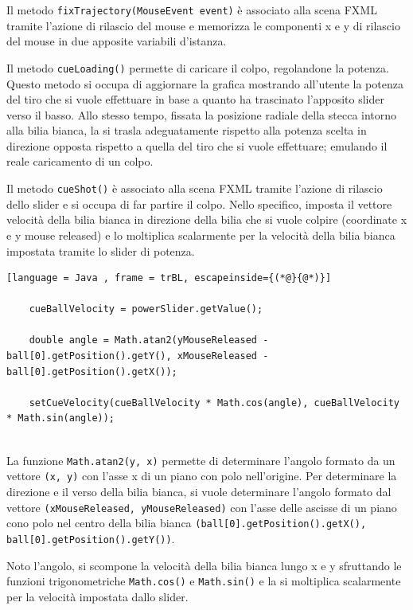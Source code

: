 \documentclass[12pt,a4paper]{report}
\begin{document}
Il metodo \texttt{fixTrajectory(MouseEvent event)} è associato alla scena FXML tramite l'azione di rilascio del mouse e memorizza le componenti x e y di rilascio del mouse in due apposite variabili d'istanza.

Il metodo \texttt{cueLoading()} permette di caricare il colpo, regolandone la potenza.
Questo metodo si occupa di aggiornare la grafica mostrando all'utente la potenza del tiro che si vuole effettuare in base a quanto ha trascinato l'apposito slider verso il basso.
Allo stesso tempo, fissata la posizione radiale della stecca intorno alla bilia bianca, la si trasla adeguatamente rispetto alla potenza scelta in direzione opposta rispetto a quella del tiro che si vuole effettuare; emulando il reale caricamento di un colpo.

Il metodo \texttt{cueShot()} è associato alla scena FXML tramite l'azione di rilascio dello slider e si occupa di far partire il colpo.
Nello specifico, imposta il vettore velocità della bilia bianca in direzione della bilia che si vuole colpire (coordinate x e y mouse released) e lo moltiplica scalarmente per la velocità della bilia bianca impostata tramite lo slider di potenza.

\vspace{5mm}

\begin{lstlisting}[language = Java , frame = trBL, escapeinside={(*@}{@*)}]

	cueBallVelocity = powerSlider.getValue();
	
    double angle = Math.atan2(yMouseReleased - ball[0].getPosition().getY(), xMouseReleased - ball[0].getPosition().getX());
    
	setCueVelocity(cueBallVelocity * Math.cos(angle), cueBallVelocity * Math.sin(angle));
	
\end{lstlisting}

\vspace{5mm}

La funzione \texttt{Math.atan2(y, x)} permette di determinare l'angolo formato da un vettore \texttt{(x, y)} con l'asse x di un piano con polo nell'origine.
Per determinare la direzione e il verso della bilia bianca, si vuole determinare l'angolo formato dal vettore \texttt{(xMouseReleased, yMouseReleased)} con l'asse delle ascisse di un piano cono polo nel centro della bilia bianca \texttt{(ball[0].getPosition().getX(), ball[0].getPosition().getY())}.

Noto l'angolo, si scompone la velocità della bilia bianca lungo x e y sfruttando le funzioni trigonometriche \texttt{Math.cos()} e \texttt{Math.sin()} e la si moltiplica scalarmente per la velocità impostata dallo slider.
\end{document}
